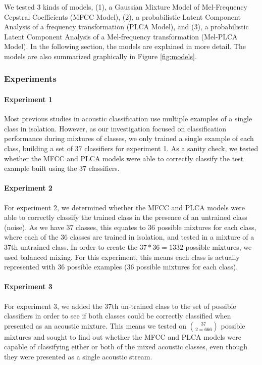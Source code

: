 \documentclass[a4paper,10pt,final]{ThesisStyle}
\begin{document}
We tested 3 kinds of models, (1), a Gaussian Mixture Model of Mel-Frequency Cepstral Coefficients (MFCC Model), (2), a probabilistic Latent Component Analysis of a frequency transformation (PLCA Model), and (3), a probabilistic Latent Component Analysis of a Mel-frequency transformation (Mel-PLCA Model).  In the following section, the models are explained in more detail.  The models are also summarized graphically in Figure \ref{fig:models}.


\subsubsection{Experiments}
\paragraph{Experiment 1}
Most previous studies in acoustic classification use multiple examples of a single class in isolation.  However, as our investigation focused on classification performance during mixtures of classes, we only trained a single example of each class, building a set of 37 classifiers for experiment 1.  As a sanity check, we tested whether the MFCC and PLCA models were able to correctly classify the test example built using the 37 classifiers.

\paragraph{Experiment 2}
For experiment 2, we determined whether the MFCC and PLCA models were able to correctly classify the trained class in the presence of an untrained class (noise).  As we have 37 classes, this equates to 36 possible mixtures for each class, where each of the 36 classes are trained in isolation, and tested in a mixture of a 37th untrained class.  In order to create the $37*36 = 1332$ possible mixtures, we used balanced mixing.  For this experiment, this means each class is actually represented with 36 possible examples (36 possible mixtures for each class).  

\paragraph{Experiment 3}
For experiment 3, we added the 37th un-trained class to the set of possible classifiers in order to see if both classes could be correctly classified when presented as an acoustic mixture.  This means we tested on $37 \choose 2 = 666$ possible mixtures and sought to find out whether the MFCC and PLCA models were capable of classifying either or both of the mixed acoustic classes, even though they were presented as a single acoustic stream.
\end{document}
